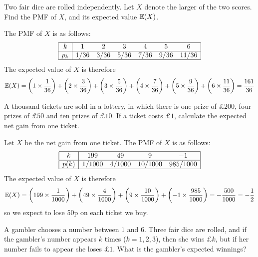 \begin{exercise}
\begin{questions}
\question
Two fair dice are rolled independently. Let $X$ denote the larger of the two scores. Find the PMF of $X$, and its expected value $\mathbb{E}(X)$.

\begin{answer}
The PMF of $X$ is as follows:
\[
\begin{array}{|c|cccccc|}\hline
k       & 1     & 2      & 3		& 4 		& 5 		& 6 \\ \hline
p_k		& 1/36  & 3/36	& 5/36	& 7/36	& 9/36	& 11/36  \\ \hline
\end{array}
\]
The expected value of $X$ is therefore
\[
\mathbb{E}(X) = \left(1 \times\frac{1}{36}\right) + \left(2 \times\frac{3}{36}\right) + \left(3 \times\frac{5}{36}\right) + \left(4 \times\frac{7}{36}\right) + \left(5 \times\frac{9}{36}\right) + \left(6 \times\frac{11}{36}\right)  = \frac{161}{36}
\]
\end{answer}



\question
A thousand tickets are sold in a lottery, in which there is one prize of $\pounds 200$, four prizes of $\pounds 50$ and ten prizes of $\pounds 10$. If a ticket costs $\pounds 1$, calculate the expected net gain from one ticket. 

\begin{answer}
Let $X$ be the net gain from one ticket. The PMF of $X$ is as follows:
\[
\begin{array}{|c|cccc|} \hline
k       & 199     & 49      	& 9			& -1 		\\ \hline
p(k)		& 1/1000  & 4/1000	& 10/1000	& 985/1000	\\ \hline
\end{array}
\]
The expected value of $X$ is therefore
\[
\mathbb{E}(X) = \left(199 \times\frac{1}{1000}\right) + \left(49 \times\frac{4}{1000}\right) + \left(9 \times\frac{10}{1000}\right) + \left(-1 \times\frac{985}{1000}\right) = - \frac{500}{1000} = -\frac{1}{2}
\]
so we expect to lose 50p on each ticket we buy.
\end{answer}

\question
A gambler chooses a number between $1$ and $6$. Three fair dice are rolled, and if the gambler's number appears $k$ times ($k=1,2,3$), then she wins $\pounds k$, but if her number fails to appear she loses $\pounds 1$. What is the gambler's expected winnings?


\end{questions}
\end{exercise}
